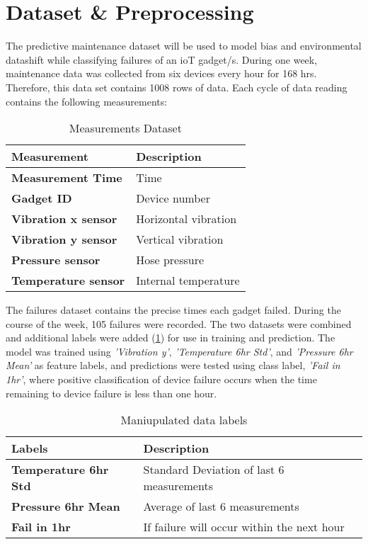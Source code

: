\section{Dataset \& Preprocessing}
The predictive maintenance dataset \cite{ahonen} will be used to model bias and environmental datashift while classifying failures of an ioT gadget/s.
During one week, maintenance data was collected from six devices every hour for 168 hrs.
Therefore, this data set contains 1008 rows of data. 
Each cycle of data reading contains the following measurements: 

\begin{table}[H]
    \begin{center}
        \caption{Measurements Dataset} 
        \begin{tabular}{ l|l } 
         \toprule
         \textbf{Measurement} & \textbf{Description} \\  [0.5ex] 
         \midrule
         \textbf{Measurement Time} & Time \\
         \textbf{Gadget ID} & Device number \\
         \textbf{Vibration x sensor} & Horizontal vibration \\ 
         \textbf{Vibration y sensor} & Vertical vibration \\ 
         \textbf{Pressure sensor} & Hose pressure \\
         \textbf{Temperature sensor} & Internal temperature \\
         \bottomrule
        \end{tabular}
    \end{center}
\end{table}

The failures dataset contains the precise times each gadget failed. 
During the course of the week, 105 failures were recorded. 
The two datasets were combined and additional labels were added (\ref{table:labels}) for use in training and prediction.
The model was trained using \textit{'Vibration y'}, \textit{'Temperature 6hr Std'}, 
and \textit{'Pressure 6hr Mean'} as feature labels, and predictions were tested using class label, \textit{'Fail in 1hr'},
where positive classification of device failure occurs when the time remaining to device failure is less than one hour.

\begin{table}[H]
    \begin{center}
        \caption{Maniupulated data labels}
        \label{table:labels} 
        \begin{tabular}{l|l}
            \toprule
            \textbf{Labels} & \textbf{Description} \\ [0.5ex]
            \midrule
            \textbf{Temperature 6hr Std} & Standard Deviation of last 6 measurements \\
            \textbf{Pressure 6hr Mean} & Average of last 6 measurements \\
            \textbf{Fail in 1hr} & If failure will occur within the next hour \\
            \bottomrule
        \end{tabular}
    \end{center}
\end{table}

